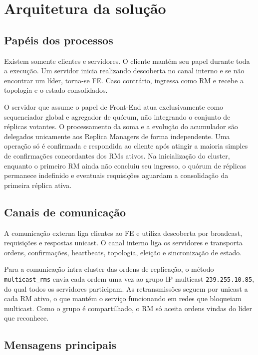 \documentclass[12pt,a4paper]{article}
\newcommand{\arquivo}[1]{\texttt{#1}}
\begin{document}
\section{Arquitetura da solução}

\subsection{Papéis dos processos}

Existem somente clientes e servidores. O cliente mantém seu papel durante toda
a execução. Um servidor inicia realizando descoberta no canal interno e se não
encontrar um líder, torna-se FE. Caso contrário, ingressa como RM e recebe a
topologia e o estado consolidados.

O servidor que assume o papel de Front-End atua exclusivamente como sequenciador global e agregador de quórum, não integrando o conjunto de réplicas votantes. O processamento da soma e a evolução do acumulador são delegados unicamente aos Replica Managers de forma independente. Uma operação só é confirmada e respondida ao cliente após atingir a maioria simples de confirmações concordantes dos RMs ativos. Na inicialização do cluster, enquanto o primeiro RM ainda não concluiu seu ingresso, o quórum de réplicas permanece indefinido e eventuais requisições aguardam a consolidação da primeira réplica ativa.

\subsection{Canais de comunicação}

A comunicação externa liga clientes ao FE e utiliza descoberta por broadcast,
requisições e respostas unicast. O canal interno liga os servidores e transporta
ordens, confirmações, heartbeats, topologia, eleição e sincronização de estado.

Para a comunicação intra-cluster das ordens de replicação, o método \arquivo{multicast\_rms} envia cada ordem uma vez ao grupo IP multicast \texttt{239.255.10.85}, do qual todos os servidores participam. As retransmissões seguem por unicast a cada RM ativo, o que mantém o serviço funcionando em redes que bloqueiam multicast. Como o grupo é compartilhado, o RM só aceita ordens vindas do líder que reconhece.

\subsection{Mensagens principais}
\end{document}
